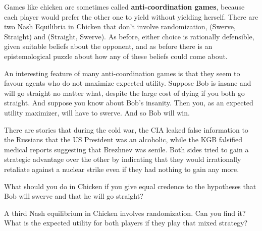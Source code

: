 Games like chicken are sometimes called \textbf{anti-coordination
  games}, because each player would prefer the other one to yield
without yielding herself.  There are two Nash Equilibria in Chicken
that don't involve randomization, (Swerve, Straight) and (Straight,
Swerve). As before, either choice is rationally defensible, given
suitable beliefs about the opponent, and as before there is an
epistemological puzzle about how any of these beliefs could come
about.

An interesting feature of many anti-coordination games is that they
seem to favour agents who do not maximize expected utility. Suppose
Bob is insane and will go straight no matter what, despite the large
cost of dying if you both go straight. And suppose you know about
Bob's insanity. Then you, as an expected utility maximizer, will have
to swerve. And so Bob will win.

There are stories that during the cold war, the CIA leaked false
information to the Russians that the US President was an alcoholic,
while the KGB falsified medical reports suggesting that Brezhnev was
senile. Both sides tried to gain a strategic advantage over the other
by indicating that they would irrationally retaliate against a nuclear
strike even if they had nothing to gain any more.

\begin{exercise1}
  What should you do in Chicken if you give equal credence to the
  hypotheses that Bob will swerve and that he will go straight?
\end{exercise1}

\begin{exercise3}
  A third Nash equilibrium in Chicken involves randomization. Can you
  find it?  What is the expected utility for both players if they play
  that mixed strategy?  
\end{exercise3}



